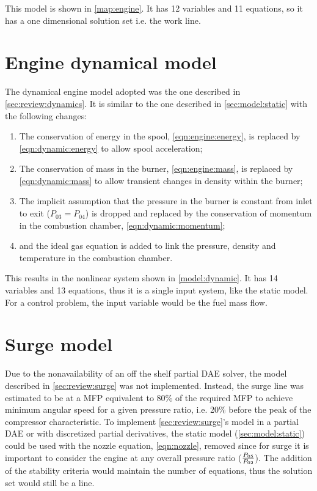 This model is shown in \cref{map:engine}. It has 12 variables and 11 equations, so it has a one dimensional solution set i.e. the work line.


\section{Engine dynamical model}
The dynamical engine model adopted was the one described in \cref{sec:review:dynamics}. It is similar to the one described in \cref{sec:model:static} with the following changes:

\begin{enumerate}
    \item The conservation of energy in the spool, \cref{eqn:engine:energy}, is replaced by \cref{eqn:dynamic:energy} to allow spool acceleration;
    \item The conservation of mass in the burner, \cref{eqn:engine:mass}, is replaced by \cref{eqn:dynamic:mass}  to allow transient changes in density within the burner;
    \item The implicit assumption that the pressure in the burner is constant from inlet to exit ($P_{03}=P_{04}$) is dropped and replaced by the conservation of momentum in the combustion chamber, \cref{eqn:dynamic:momentum};
    \item and the ideal gas equation is added to link the pressure, density and temperature in the combustion chamber.
\end{enumerate}

This results in the nonlinear system shown in \cref{model:dynamic}. It has 14 variables and 13 equations, thus it is a single input system, like the static model. For a control problem, the input variable would be the fuel mass flow.



\section{Surge model}

Due to the nonavailability of an off the shelf partial \ac{DAE} solver, the model described in \cref{sec:review:surge} was not implemented. Instead, the surge line was estimated to be at a \acs{MFP} equivalent to 80\% of the required \acs{MFP} to achieve minimum angular speed for a given pressure ratio, i.e. 20\% before the peak of the compressor characteristic. 
To implement \cref{sec:review:surge}'s model in a partial \ac{DAE} or with discretized partial derivatives, the static model (\cref{sec:model:static}) could be used with the nozzle equation, \cref{eqn:nozzle}, removed since for surge it is important to consider the engine at any overall pressure ratio ($\frac{P_{05}}{P_{02}}$). The addition of the stability criteria would maintain the number of equations, thus the solution set would still be a line.

